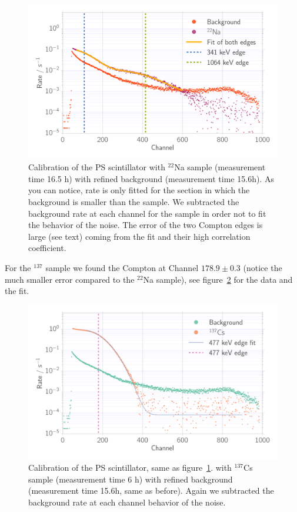 \begin{figure}[htpb]
    \centering
    \includegraphics[width=0.9\linewidth]{./analysis/figures/calib_ps_na}
    \caption{Calibration of the PS scintillator with $^{22}$Na sample (measurement time
    16.5 h) with refined background (measurement time 15.6h). As you can notice, rate is 
only fitted for the section in which the background is smaller than the sample. We
subtracted the background rate at each channel for the sample in order not to fit the 
behavior of the noise. The error of the two Compton edges is large (see text) coming
from the fit and their high correlation coefficient.}
\label{fig:calib_ps_na}
\end{figure}
For the $^{137}$ sample we found the Compton at Channel $178.9 \pm 0.3$ 
(notice the much smaller error compared to the $^{22}$Na sample), 
see figure~\ref{fig:calib_ps_cs} for the data and the fit.
\begin{figure}[htpb]
    \centering
    \includegraphics[width=0.9\linewidth]{./analysis/figures/calib_ps_cs}
    \caption{Calibration of the PS scintillator, same as figure~\ref{fig:calib_ps_na}. 
        with $^{137}$Cs sample (measurement time
    6 h) with refined background (measurement time 15.6h, same as before). 
Again we subtracted the background rate at each channel behavior of the noise. }
\label{fig:calib_ps_cs}
\end{figure}

